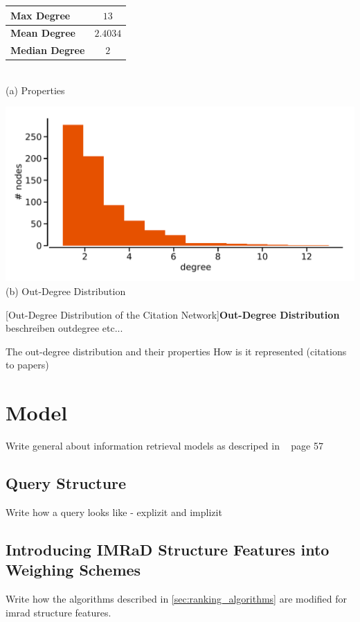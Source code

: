 \begin{minipage}[!t]{\textwidth}
  \begin{minipage}[b]{0.39\textwidth}
    \centering
    \begin{tabular}{ l c }
      \toprule
      \textbf{Max Degree}    & $13$     \\ \midrule
      \textbf{Mean Degree}   & $2.4034$ \\ \midrule
      \textbf{Median Degree} & $2$      \\
      \bottomrule
  \end{tabular} \\
  \vspace*{1cm}
  (a) Properties
\end{minipage}
\begin{minipage}[b]{0.59\textwidth}
  \centering
  \includegraphics[width=1.0\textwidth]{figures/out-degree_distribution} \\
  (b) Out-Degree Distribution
  \end{minipage}
  [Out-Degree Distribution of the Citation Network]{\textbf{Out-Degree Distribution} beschreiben outdegree etc...}
  \label{fig:indegree_distribution}
\end{minipage}

The out-degree distribution and their properties How is it represented (citations to papers)

\section{Model}
\label{sec:model}

Write general about information retrieval models as descriped in ~\cite{ModernInvormationRetrieval1999} page 57

\subsection{Query Structure}

Write how a query looks like - explizit and implizit

\subsection{Introducing IMRaD Structure Features into Weighing Schemes}

Write how the algorithms described in \cref{sec:ranking_algorithms} are modified for imrad structure features.
